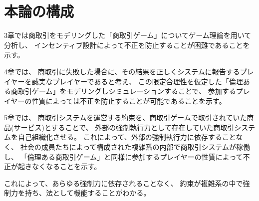   \section{本論の構成}
  3章では商取引をモデリングした「商取引ゲーム」についてゲーム理論を用いて分析し、
  インセンティブ設計によって不正を防止することが困難であることを示す。
  

  4章では、
  商取引に失敗した場合に、その結果を正しくシステムに報告するプレイヤーを誠実なプレイヤーであると考え、
  この限定合理性を仮定した「倫理ある商取引ゲーム」をモデリングしシミュレーションすることで、
  参加するプレイヤーの性質によっては不正を防止することが可能であることを示す。

  5章では、
  商取引システムを運営する約束を、商取引ゲームで取引されていた商品(サービス)とすることで、
  外部の強制執行力として存在していた商取引システムを自己組織化させる。
  これによって、外部の強制執行力に依存することなく、
  社会の成員たちによって構成された複雑系の内部で商取引システムが稼働し、
  「倫理ある商取引ゲーム」と同様に参加するプレイヤーの性質によって不正が起きなくなることを示す。
  
  これによって、あらゆる強制力に依存されることなく、
  約束が複雑系の中で強制力を持ち、法として機能することがわかる。

